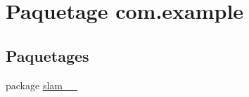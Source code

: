 \hypertarget{namespacecom_1_1example}{}\section{Paquetage com.\+example}
\label{namespacecom_1_1example}
\subsection*{Paquetages}
\begin{DoxyCompactItemize}
\item 
package \hyperlink{namespacecom_1_1example_1_1slam__2017__17}{slam\+\_\+\_}
\end{DoxyCompactItemize}
